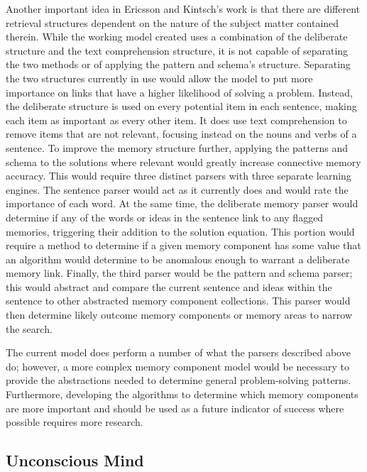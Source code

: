 Another important idea in Ericsson and Kintsch's work is that there are
different retrieval structures dependent on the nature of the subject matter contained
therein.  While the working model created uses a combination of the deliberate
structure and the text comprehension structure, it is not capable of separating
the two methods or of applying the pattern and schema's structure.  Separating the
two structures currently in use would allow the model to put more importance on
links that have a higher likelihood of solving a problem.  Instead, the
deliberate structure is used on every potential item in each sentence, making
each item as important as every other item.  It does use text comprehension to
remove items that are not relevant, focusing instead on the nouns and verbs of a
sentence.  To improve the memory structure further, applying the patterns and
schema to the solutions where relevant would greatly increase connective memory
accuracy.  This would require three distinct parsers with three separate
learning engines.  The sentence parser would act as it currently does and would rate
the importance of each word.  At the same time, the deliberate memory parser
would determine if any of the words or ideas in the sentence link to any flagged
memories, triggering their addition to the solution equation.  This portion
would require a method to determine if a given memory component has some value
that an algorithm would determine to be anomalous enough to warrant a deliberate
memory link. Finally, the third parser would be the pattern and schema parser; 
this would abstract and compare the current sentence and ideas within the
sentence to other abstracted memory component collections.  This parser would
then determine likely outcome memory components or memory areas to narrow the
search.

The current model does perform a number of what the parsers described above do; 
however, a more complex memory component model would be necessary to provide the
abstractions needed to determine general problem-solving patterns.  Furthermore,
developing the algorithms to determine which memory components are more
important and should be used as a future indicator of success where possible
requires more research.

\subsection{Unconscious Mind}


